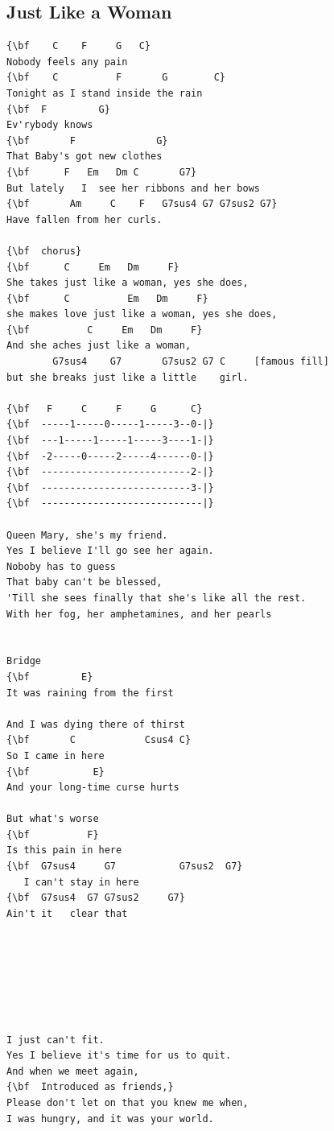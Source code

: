 \documentclass[a4paper]{article}
\begin{document}
\subsection{Just Like a Woman}
\begin{Verbatim}[commandchars=\\\{\}]
{\bf    C    F     G   C}
Nobody feels any pain
{\bf    C          F       G        C}
Tonight as I stand inside the rain
{\bf  F         G}
Ev'rybody knows
{\bf       F              G}
That Baby's got new clothes
{\bf      F   Em   Dm C       G7}
But lately   I  see her ribbons and her bows
{\bf       Am     C    F   G7sus4 G7 G7sus2 G7}
Have fallen from her curls.

{\bf  chorus}
{\bf      C     Em   Dm     F}
She takes just like a woman, yes she does,
{\bf      C          Em   Dm     F}
she makes love just like a woman, yes she does,
{\bf          C     Em   Dm     F}
And she aches just like a woman,
        G7sus4    G7       G7sus2 G7 C     [famous fill]
but she breaks just like a little    girl.

{\bf   F     C     F     G      C}
{\bf  -----1-----0-----1-----3--0-|}
{\bf  ---1-----1-----1-----3----1-|}
{\bf  -2-----0-----2-----4------0-|}
{\bf  --------------------------2-|}
{\bf  --------------------------3-|}
{\bf  ----------------------------|}

Queen Mary, she's my friend.
Yes I believe I'll go see her again.
Noboby has to guess
That baby can't be blessed,
'Till she sees finally that she's like all the rest.
With her fog, her amphetamines, and her pearls


Bridge
{\bf         E}
It was raining from the first

And I was dying there of thirst
{\bf       C            Csus4 C}
So I came in here
{\bf           E}
And your long-time curse hurts

But what's worse
{\bf          F}
Is this pain in here
{\bf  G7sus4     G7           G7sus2  G7}
   I can't stay in here
{\bf  G7sus4  G7 G7sus2     G7}
Ain't it   clear that







I just can't fit.
Yes I believe it's time for us to quit.
And when we meet again,
{\bf  Introduced as friends,}
Please don't let on that you knew me when,
I was hungry, and it was your world.

\end{Verbatim}
\newpage
\end{document}
